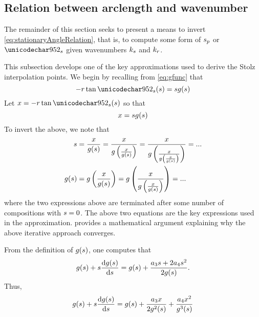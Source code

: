 \subsection{Relation between arclength and wavenumber}
The remainder of this section seeks to present a means to invert \eqref{eq:stationaryAngleRelation}, that is, to compute some form of $s_p$ or $\thetas$ given wavenumbers $k_{s}$ and $k_r$.
\par
This subsection develops one of the key approximations used to derive the Stolz interpolation points. We begin by recalling from \eqref{eq:gfunc} that 
\begin{equation}
 -\targetrange\tan\thetas(\parm) = \parm\gfunc(\parm)
\end{equation}
Let $\xang=-\targetrange\tan\thetas(\parm)$ so that
\begin{equation}
 x = sg(s)
\end{equation}
To invert the above, we note that
\begin{equation}
\begin{split}
 \parm &= \frac{\xang}{\gfunc(\parm)} = \frac{\xang}{\gfunc\left(\frac{\xang}{\gfunc(\parm)}\right)} = \frac{\xang}{\gfunc\left(\frac{\xang}{\gfunc\left(\frac{\xang}{\gfunc(\parm)}\right)}\right)} = ...\\
 \gfunc(\parm) &= \gfunc\left(\frac{\xang}{\gfunc(\parm)}\right) = \gfunc\left(\frac{\xang}{\gfunc\left(\frac{\xang}{\gfunc(\parm)}\right)}\right) = ...
\end{split}
\label{eq:Sdefinition}
\end{equation}
where the two expressions above are terminated after some number of compositions with $s=0$. The above two equations are the key expressions used in the approximation.  provides a mathematical argument explaining why the above iterative approach converges. 
\par
From the definition of $g(s)$, one computes that
\begin{equation}
 \gfunc(\parm) + \parm\frac{\d\gfunc(\parm)}{\d\parm}    = \gfunc(\parm) + \frac{\rcoeff_3\parm + 2\rcoeff_4\parm^2}{2\gfunc(\parm)}.%
\end{equation}
Thus,
\begin{equation}
\begin{split}
\gfunc(\parm) + \parm\frac{\d\gfunc(\parm)}{\d\parm} = \gfunc(\parm) + \frac{\rcoeff_3\xang}{2\gfunc^2(\parm)} + \frac{\rcoeff_4\xang^2}{\gfunc^3(\parm)}\\ %
\end{split}
\end{equation}
